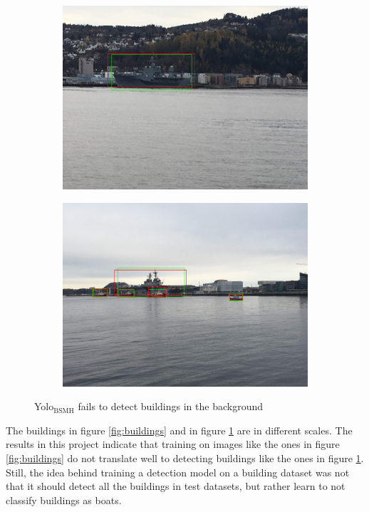 \begin{figure}[h!]
\begin{subfigure}{.5\textwidth}
  \centering
  \includegraphics[width=0.8\linewidth]{discussion/yolo3_no_build/IMG_2673.jpg}
\end{subfigure}%
\begin{subfigure}{.5\textwidth}
  \centering
  \includegraphics[width=.8\linewidth]{discussion/yolo3_no_build/IMG_2695.jpg}
\end{subfigure}
\caption{Yolo$_{\text{BSMH}}$ fails to detect buildings in the background}
\label{fig:yolo3_no_build}
\end{figure}


The buildings in figure \ref{fig:buildings} and in figure \ref{fig:yolo3_no_build} are in different scales. The results in this project indicate that training on images like the ones in figure \ref{fig:buildings} do not translate well to detecting buildings like the ones in figure \ref{fig:yolo3_no_build}. Still, the idea behind training a detection model on a building dataset was not that it should detect all the buildings in test datasets, but rather learn to not classify buildings as boats. 

